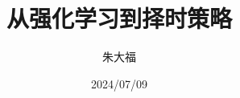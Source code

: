 \documentclass[8pt]{beamer}
\title{\songti 从强化学习到择时策略} %
\author{朱大福} %
\institute[School of Economics (SOE)\\
Wang Yanan Institute for Studies in Economic \\ Xiamen University] %
\date{2024/07/09} %
\begin{document}
\songti
\begin{frame}
\titlepage %
\end{frame}
%





\end{document}
